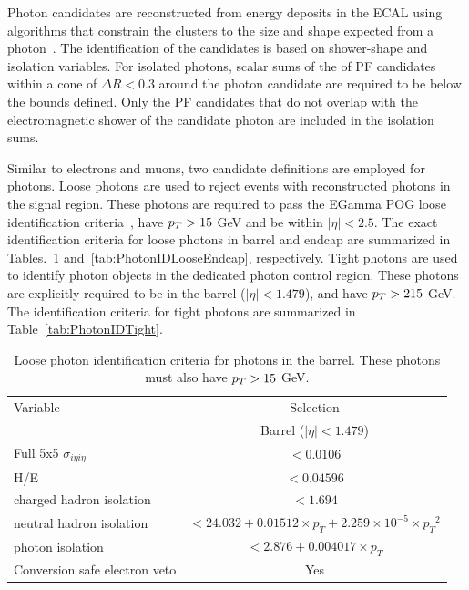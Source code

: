 Photon candidates are reconstructed from energy deposits in the ECAL using algorithms
that constrain the clusters to the size and shape expected from a photon~\cite{CMS:EGM-14-001}.
The identification of the candidates is based on shower-shape and isolation variables.
For isolated photons, scalar sums of the \pt of PF candidates within a cone of $\Delta R < 0.3$
around the photon candidate are required to be below the bounds defined. Only the PF candidates
that do not overlap with the electromagnetic shower of the candidate photon are included in the isolation sums.

Similar to electrons and muons, two candidate definitions are employed for photons. Loose photons are used to reject
events with reconstructed photons in the signal region. These photons are required to pass the EGamma POG loose identification criteria~\cite{CMS-EGM-TWIKI-GAMID},
have $p_T > 15$ GeV and be within $|\eta|<2.5$. The exact identification criteria for loose photons in barrel and endcap 
are summarized in Tables.~\ref{tab:PhotonIDLooseBarrel} and~\ref{tab:PhotonIDLooseEndcap}, respectively.
Tight photons are used to identify photon objects in the dedicated photon control region. 
These photons are explicitly required to be in the barrel ($|\eta|<1.479$), and have $p_T>215$ GeV. The identification criteria for tight photons
are summarized in Table~\ref{tab:PhotonIDTight}.

\begin{table}[htb!]
    \centering
    \small
    \def\arraystretch{1.2}
    \begin{tabular}{l c}
    \hline
    Variable                                   &  Selection       \\
                                               &  Barrel ($|\eta|<1.479$) \\
    \hline
    \hline
    Full 5x5 $\sigma_{i\eta i\eta}$            & $< 0.0106 $    \\
    H/E                                        & $<  0.04596 $    \\
    charged hadron isolation                   & $< 1.694 $     \\
    neutral hadron isolation                   & $< 24.032 + 0.01512\times p_T+2.259\times 10^{-5} \times {p_T}^2$ \\
    photon isolation                           & $< 2.876 + 0.004017\times p_T$  \\
    Conversion safe electron veto              & Yes           \\
    \hline
    \end{tabular}
    \caption{Loose photon identification criteria for photons in the barrel. These photons must also have $p_T > 15$ GeV.}
    \label{tab:PhotonIDLooseBarrel}
\end{table}

